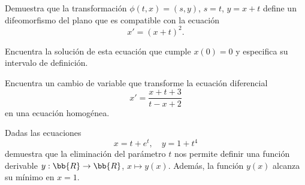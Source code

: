 \documentclass[12pt]{article}
\begin{document}
\begin{ejercicio}
    Demuestra que la transformación \(\phi(t, x) = (s, y)\), \(s = t\), \(y = x + t\) define un difeomorfismo del plano que es compatible con la ecuación
    \[
        x' = (x + t)^2.
    \]

    Encuentra la solución de esta ecuación que cumple \(x(0) = 0\) y especifica su intervalo de definición.
\end{ejercicio}

\begin{ejercicio}
    Encuentra un cambio de variable que transforme la ecuación diferencial
    \[
        x' = \dfrac{x + t + 3}{t - x + 2}
    \]
    en una ecuación homogénea.
\end{ejercicio}

\begin{ejercicio}
    Dadas las ecuaciones
    \[
        x = t + e^t, \quad y = 1 + t^4
    \]
    demuestra que la eliminación del parámetro \(t\) nos permite definir una función derivable \(y : \bb{R} \to \bb{R}\), \(x \mapsto y(x)\). Además, la función \(y(x)\) alcanza su mínimo en \(x = 1\).
\end{ejercicio}
\end{document}

